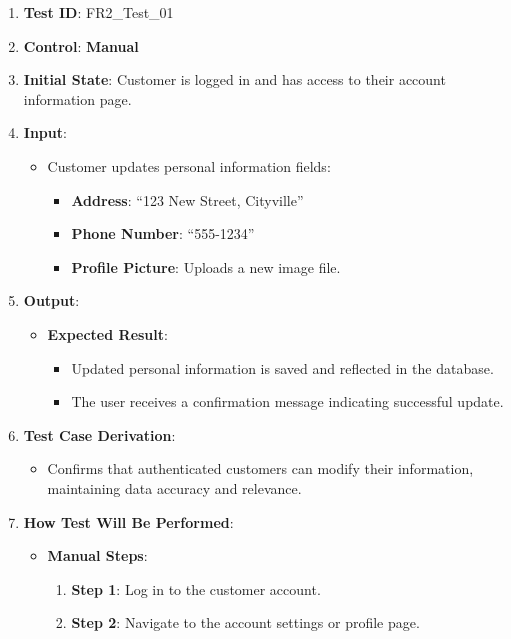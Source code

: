 \documentclass[12pt, titlepage]{article}
\begin{document}
\begin{enumerate}
    \item \textbf{Test ID}: FR2\_Test\_01
    \item \textbf{Control}: \textbf{Manual}
    \item \textbf{Initial State}: Customer is logged in and has access to their account information page.
    \item \textbf{Input}:
    \begin{itemize}
        \item Customer updates personal information fields:
        \begin{itemize}
            \item \textbf{Address}: ``123 New Street, Cityville''
            \item \textbf{Phone Number}: ``555-1234''
            \item \textbf{Profile Picture}: Uploads a new image file.
        \end{itemize}
    \end{itemize}
    \item \textbf{Output}:
    \begin{itemize}
        \item \textbf{Expected Result}:
        \begin{itemize}
            \item Updated personal information is saved and reflected in the database.
            \item The user receives a confirmation message indicating successful update.
        \end{itemize}
    \end{itemize}
    \item \textbf{Test Case Derivation}:
    \begin{itemize}
        \item Confirms that authenticated customers can modify their information, maintaining data accuracy and relevance.
    \end{itemize}
    \item \textbf{How Test Will Be Performed}:
    \begin{itemize}
        \item \textbf{Manual Steps}:
        \begin{enumerate}
            \item \textbf{Step 1}: Log in to the customer account.
            \item \textbf{Step 2}: Navigate to the account settings or profile page.

\end{enumerate}
\end{itemize}
\end{enumerate}
\end{document}
